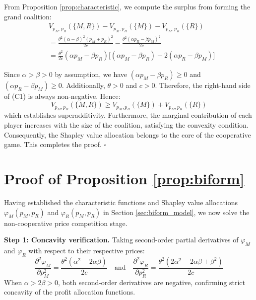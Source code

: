 \documentclass[authoryear,preprint,review,times,10pt]{elsarticle}
\begin{document}
From Proposition \ref{prop:characteristic}, we compute the surplus from forming the grand coalition:
\begin{equation}
\begin{aligned}
& V_{p_M,p_R}(\{M,R\}) - V_{p_M,p_R}(\{M\}) - V_{p_M,p_R}(\{R\}) \\
&= \frac{\theta^2(\alpha - \beta)^2(p_M + p_R)^2}{2c} - \frac{\theta^2(\alpha p_R - \beta p_M)^2}{2c} \\
&= \frac{\theta^2}{2c}(\alpha p_M - \beta p_R)\big[(\alpha p_M - \beta p_R) + 2(\alpha p_R - \beta p_M)\big]
\end{aligned}
\tag{C1}
\end{equation}

Since $\alpha > \beta > 0$ by assumption, we have $(\alpha p_M - \beta p_R) \geq 0$ and $(\alpha p_R - \beta p_M) \geq 0$. Additionally, $\theta > 0$ and $c > 0$. Therefore, the right-hand side of (C1) is always non-negative. Hence:
\begin{equation}
V_{p_M,p_R}(\{M,R\}) \geq V_{p_M,p_R}(\{M\}) + V_{p_M,p_R}(\{R\})
\end{equation}
which establishes superadditivity. Furthermore, the marginal contribution of each player increases with the size of the coalition, satisfying the convexity condition. Consequently, the Shapley value allocation belongs to the core of the cooperative game. This completes the proof. \hfill $\square$

\section{Proof of Proposition \ref{prop:biform}}
\label{app:prop4}

Having established the characteristic functions and Shapley value allocations $\varphi_M(p_M, p_R)$ and $\varphi_R(p_M, p_R)$ in Section \ref{sec:biform_model}, we now solve the non-cooperative price competition stage.

\textbf{Step 1: Concavity verification.} Taking second-order partial derivatives of $\varphi_M$ and $\varphi_R$ with respect to their respective prices:
\begin{equation}
\frac{\partial^2 \varphi_M}{\partial p_M^2} = \frac{\theta^2(\alpha^2 - 2\alpha\beta)}{2c}
\quad \text{and} \quad
\frac{\partial^2 \varphi_R}{\partial p_R^2} = \frac{\theta^2(2\alpha^2 - 2\alpha\beta + \beta^2)}{2c}
\end{equation}
When $\alpha > 2\beta > 0$, both second-order derivatives are negative, confirming strict concavity of the profit allocation functions.
\end{document}
